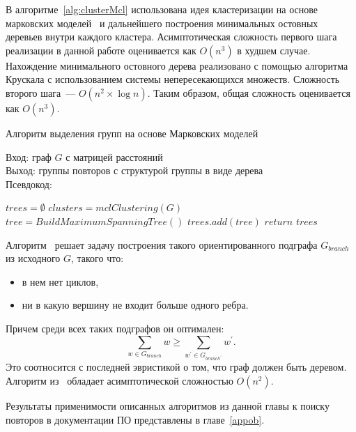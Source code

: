 В алгоритме~\ref{alg:clusterMcl} использована идея кластеризации на основе марковских моделей~\cite{dongen2000cluster} и дальнейшего построения минимальных остовных деревьев внутри каждого кластера.
Асимптотическая сложность первого шага реализации в данной работе оценивается как $O(n^3)$ в худшем случае.
Нахождение минимального остовного дерева реализовано с помощью алгоритма Крускала с использованием системы непересекающихся множеств.
Сложность второго шага~--- $O(n^2 \times \log n)$.
Таким образом, общая сложность оценивается как $O(n^3)$.

\begin{algorithm}[t!]
\caption{Алгоритм выделения групп на основе Марковских моделей}\label{alg:clusterMcl}
Вход: граф $G$ с матрицей расстояний\\
Выход: группы повторов с структурой группы в виде дерева\\
Псевдокод:
\begin{algorithmic}[1]
\State $trees = \emptyset$
\State $ clusters = mclClustering(G)$
\State $tree =  BuildMaximumSpanningTree()$
\State $trees.add(tree)$
\EndFor
\State
\State $return$ $trees$
\end{algorithmic}
\end{algorithm}

Алгоритм~\cite{tofigh2009optimum} решает задачу построения такого ориентированного подграфа $G_{branch}$ из исходного $G$, такого что:
\begin{itemize}
    \item в нем нет циклов,
    \item ни в какую вершину не входит больше одного ребра.
\end{itemize}
Причем среди всех таких подграфов он оптимален:
\begin{equation}
\sum_{w \in G_{branch}} w \geq \sum_{w^{'} \in G_{branch^{'}}} w^{'}.
\end{equation}
Это соотносится с последней эвристикой о том, что граф должен быть деревом.
Алгоритм из~\cite{tofigh2009optimum} обладает асимптотической сложностью $O(n^2)$.

%  

Результаты применимости описанных алгоритмов из  данной главы к поиску повторов в документации ПО представлены в главе~\ref{appob}.


